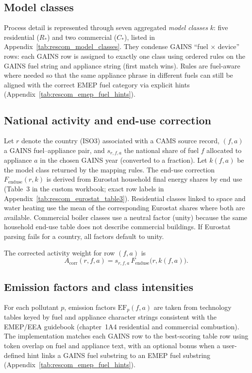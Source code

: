 \subsection{Model classes}

Process detail is represented through seven aggregated \emph{model classes}
$k$: five residential ($R_{\ast}$) and two commercial ($C_{\ast}$), listed in
Appendix~\ref{tab:rescom_model_classes}. They condense GAINS ``fuel $\times$
device'' rows: each GAINS row is assigned to exactly one class using ordered
rules on the GAINS fuel string and appliance string (first match wins). Rules
are fuel-aware where needed so that the same appliance phrase in different
fuels can still be aligned with the correct EMEP fuel category via explicit
hints (Appendix~\ref{tab:rescom_emep_fuel_hints}).

\subsection{National activity and end-use correction}

Let $r$ denote the country (ISO3) associated with a CAMS source record, $(f,a)$
a GAINS fuel--appliance pair, and $s_{r,f,a}$ the national share of fuel $f$
allocated to appliance $a$ in the chosen GAINS year (converted to a fraction).
Let $k(f,a)$ be the model class returned by the mapping rules. The
end-use correction $F_{\mathrm{enduse}}(r,k)$ is derived from Eurostat household
final energy shares by end use (Table~3 in the custom workbook; exact row
labels in Appendix~\ref{tab:rescom_eurostat_table3}). Residential classes
linked to space and water heating use the mean of the corresponding Eurostat
shares where both are available. Commercial boiler classes use a neutral
factor (unity) because the same household end-use table does not describe
commercial buildings. If Eurostat parsing fails for a country, all factors
default to unity.

The corrected activity weight for row $(f,a)$ is
\begin{equation}
  A_{\mathrm{corr}}(r,f,a) = s_{r,f,a}\, F_{\mathrm{enduse}}\bigl(r,k(f,a)\bigr).
\end{equation}

\subsection{Emission factors and class intensities}

For each pollutant $p$, emission factors $\mathrm{EF}_p(f,a)$ are taken from
technology tables keyed by fuel and appliance character strings consistent with
the EMEP/EEA guidebook (chapter~1A4 residential and commercial combustion).
The implementation matches each GAINS row to the best-scoring table row using
token overlap on fuel and appliance text, with an optional bonus when a
user-defined hint links a GAINS fuel substring to an EMEP fuel substring
(Appendix~\ref{tab:rescom_emep_fuel_hints}).


